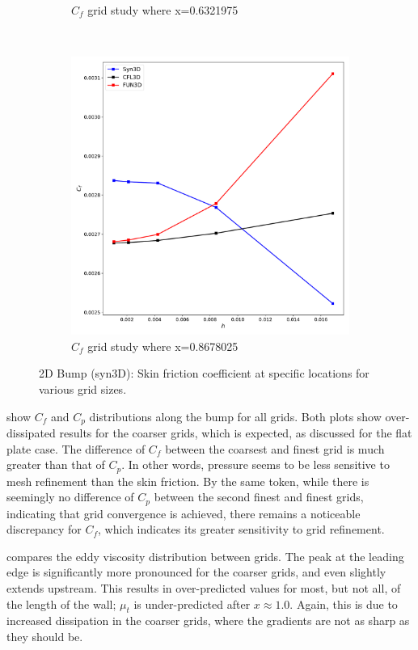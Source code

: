 \begin{figure}[ht!]
\begin{subfigure}{.45\textwidth}
  \caption{$C_f$ grid study where x=0.6321975}
\end{subfigure}
\\
\begin{subfigure}{.45\textwidth}
  \centering
  \includegraphics[width=1.0\textwidth]{figs/2dbump/Cf08678025GridStudy.pdf}
  \caption{$C_f$ grid study where x=0.8678025}
\end{subfigure}%
\caption{2D Bump (syn3D): Skin friction coefficient at specific locations for various grid sizes.}
\label{fig:syn2dbumpcflocstudy}
\end{figure}

 show $C_f$ and $C_p$ distributions along the bump for all grids. Both plots show over-dissipated results for the coarser grids, which is expected, as discussed for the flat plate case. The difference of $C_f$ between the coarsest and finest grid is much greater than that of $C_p$. In other words, pressure seems to be less sensitive to mesh refinement than the skin friction. By the same token, while there is seemingly no difference of $C_p$ between the second finest and finest grids, indicating that grid convergence is achieved, there remains a noticeable discrepancy for $C_f$, which indicates its greater sensitivity to grid refinement.

 compares the eddy viscosity distribution between grids. The peak at the leading edge is significantly more pronounced for the coarser grids, and even slightly extends upstream. This results in over-predicted values for most, but not all, of the length of the wall; $\mu_t$ is under-predicted after $x\approx1.0$. Again, this is due to increased dissipation in the coarser grids, where the gradients are not as sharp as they should be.

